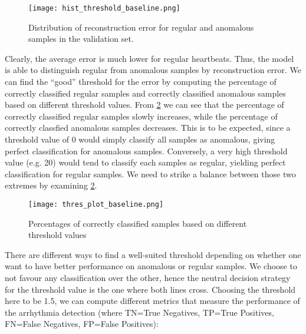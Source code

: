\begin{figure}[H]
    \centering
    \texttt{[image: hist\_threshold\_baseline.png]}
    \caption{Distribution of reconstruction error for regular and anomalous samples in the validation set.}\label{fig:distr_err_baseline}
\end{figure}
Clearly, the average error is much lower for regular heartbeats. Thus, the model is able to distinguish regular from anomalous samples by reconstruction error. We can find the ``good'' threshold for the error by computing the percentage of correctly classified regular samples and correctly classified anomalous samples based on different threshold values. From \cref{fig:thres_baseline} we can see that the percentage of correctly classified regular samples slowly increases, while the percentage of correctly classfied anomalous samples decreases. This is to be expected, since a threshold value of 0 would simply classify all samples as anomalous, giving perfect classification for anomalous samples. Conversely, a very high threshold value (e.g. 20) would tend to classify each samples as regular, yielding perfect classification for regular samples. We need to strike a balance between those two extremes by examining \cref{fig:thres_baseline}.

\begin{figure}[h]
    \centering
    \texttt{[image: thres\_plot\_baseline.png]}
    \caption{Percentages of correctly classified samples based on different threshold values}
    \label{fig:thres_baseline}
\end{figure}

There are different ways to find a well-suited threshold depending on whether one want to have better performance on anomalous or regular samples. We choose to not favour any classification over the other, hence the neutral decision strategy for the threshold value is the one where both lines cross. Choosing the threshold here to be 1.5, we can compute different metrics that measure the performance of the arrhythmia detection (where TN=True Negatives, TP=True Positives, FN=False Negatives, FP=False Positives):

